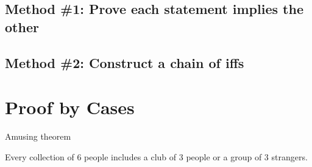 \subsection{Method \#1: Prove each statement implies the other}
\subsection{Method \#2: Construct a chain of iffs}

\section{Proof by Cases}
Amusing theorem
\begin{thm}
    Every collection of 6 people includes a club of 3 people or a group of 3 strangers.
\end{thm}
